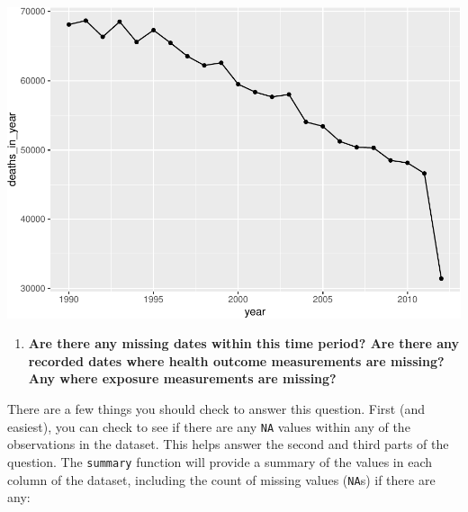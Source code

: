 \documentclass[
]{book}
\newenvironment{Shaded}{\begin{snugshade}}{\end{snugshade}}
\newcommand{\DataTypeTok}[1]{\textcolor[rgb]{0.13,0.29,0.53}{#1}}
\newcommand{\KeywordTok}[1]{\textcolor[rgb]{0.13,0.29,0.53}{\textbf{#1}}}
\newcommand{\NormalTok}[1]{#1}
\newcommand{\OperatorTok}[1]{\textcolor[rgb]{0.81,0.36,0.00}{\textbf{#1}}}
\newcommand{\StringTok}[1]{\textcolor[rgb]{0.31,0.60,0.02}{#1}}
\providecommand{\tightlist}{%
  \setlength{\itemsep}{0pt}\setlength{\parskip}{0pt}}
\begin{document}
\begin{Shaded}
\end{Shaded}

\includegraphics{adv_epi_analysis_files/figure-latex/unnamed-chunk-7-1.pdf}

\begin{enumerate}
\def\labelenumi{\arabic{enumi}.}
\setcounter{enumi}{1}
\tightlist
\item
  \textbf{Are there any missing dates within this time period? Are there any recorded
  dates where health outcome measurements are missing?
  Any where exposure measurements are missing?}
\end{enumerate}

There are a few things you should check to answer this question. First
(and easiest), you can check to see if there are any \texttt{NA} values within
any of the observations in the dataset. This helps answer the second and third
parts of the question. The \texttt{summary} function will provide
a summary of the values in each column of the dataset, including the count
of missing values (\texttt{NA}s) if there are any:
\end{document}
